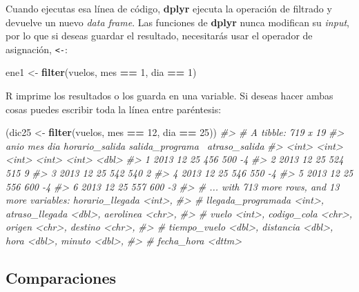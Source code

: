 \documentclass[11pt,oneside]{report}
\newenvironment{Shaded}{\begin{snugshade}}{\end{snugshade}}
\newcommand{\CommentTok}[1]{\textcolor[rgb]{0.56,0.35,0.01}{\textit{#1}}}
\newcommand{\DecValTok}[1]{\textcolor[rgb]{0.00,0.00,0.81}{#1}}
\newcommand{\KeywordTok}[1]{\textcolor[rgb]{0.13,0.29,0.53}{\textbf{#1}}}
\newcommand{\NormalTok}[1]{#1}
\newcommand{\OperatorTok}[1]{\textcolor[rgb]{0.81,0.36,0.00}{\textbf{#1}}}
\newcommand{\StringTok}[1]{\textcolor[rgb]{0.31,0.60,0.02}{#1}}
\begin{document}
Cuando ejecutas esa línea de código, \textbf{dplyr} ejecuta la operación
de filtrado y devuelve un nuevo \emph{data frame}. Las funciones de
\textbf{dplyr} nunca modifican su \emph{input}, por lo que si deseas
guardar el resultado, necesitarás usar el operador de asignación,
\texttt{\textless{}-}:

\begin{Shaded}
\begin{Highlighting}[]
\NormalTok{ene1 <-}\StringTok{ }\KeywordTok{filter}\NormalTok{(vuelos, mes }\OperatorTok{==}\StringTok{ }\DecValTok{1}\NormalTok{, dia }\OperatorTok{==}\StringTok{ }\DecValTok{1}\NormalTok{)}
\end{Highlighting}
\end{Shaded}

R imprime los resultados o los guarda en una variable. Si deseas hacer
ambas cosas puedes escribir toda la línea entre paréntesis:

\begin{Shaded}
\begin{Highlighting}[]
\NormalTok{(dic25 <-}\StringTok{ }\KeywordTok{filter}\NormalTok{(vuelos, mes }\OperatorTok{==}\StringTok{ }\DecValTok{12}\NormalTok{, dia }\OperatorTok{==}\StringTok{ }\DecValTok{25}\NormalTok{))}
\CommentTok{#> # A tibble: 719 x 19}
\CommentTok{#>    anio   mes   dia horario_salida salida_programa~ atraso_salida}
\CommentTok{#>   <int> <int> <int>          <int>            <int>         <dbl>}
\CommentTok{#> 1  2013    12    25            456              500            -4}
\CommentTok{#> 2  2013    12    25            524              515             9}
\CommentTok{#> 3  2013    12    25            542              540             2}
\CommentTok{#> 4  2013    12    25            546              550            -4}
\CommentTok{#> 5  2013    12    25            556              600            -4}
\CommentTok{#> 6  2013    12    25            557              600            -3}
\CommentTok{#> # ... with 713 more rows, and 13 more variables: horario_llegada <int>,}
\CommentTok{#> #   llegada_programada <int>, atraso_llegada <dbl>, aerolinea <chr>,}
\CommentTok{#> #   vuelo <int>, codigo_cola <chr>, origen <chr>, destino <chr>,}
\CommentTok{#> #   tiempo_vuelo <dbl>, distancia <dbl>, hora <dbl>, minuto <dbl>,}
\CommentTok{#> #   fecha_hora <dttm>}
\end{Highlighting}
\end{Shaded}

\hypertarget{comparaciones}{%
\subsection{Comparaciones}\label{comparaciones}}
\end{document}
